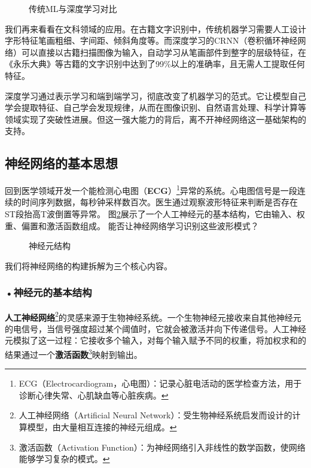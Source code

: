 \begin{figure}[H]
\centering
{}
\caption{传统ML与深度学习对比}
\label{fig:ch2_2_9}
\end{figure}


我们再来看看在文科领域的应用。在古籍文字识别中，传统机器学习需要人工设计字形特征笔画粗细、字间距、倾斜角度等。而深度学习的CRNN（卷积循环神经网络）可以直接以古籍扫描图像为输入，自动学习从笔画部件到整字的层级特征，在《永乐大典》等古籍的文字识别中达到了99\%以上的准确率，且无需人工提取任何特征。

深度学习通过表示学习和端到端学习，彻底改变了机器学习的范式。它让模型自己学会提取特征、自己学会发现规律，从而在图像识别、自然语言处理、科学计算等领域实现了突破性进展。但这一强大能力的背后，离不开神经网络这一基础架构的支持。





\subsection{神经网络的基本思想}
回到医学领域开发一个能检测心电图（\textbf{ECG}）\footnote{ECG（Electrocardiogram，心电图）：记录心脏电活动的医学检查方法，用于诊断心律失常、心肌缺血等心脏疾病。}异常的系统。心电图信号是一段连续的时间序列数据，每秒钟采样数百次。医生通过观察波形特征来判断是否存在ST段抬高T波倒置等异常。
图\ref{fig:ch2_2_10}展示了一个人工神经元的基本结构，它由输入、权重、偏置和激活函数组成。
能否让神经网络学习识别这些波形模式？
\begin{figure}[H]
\centering
{}
\caption{神经元结构}
\label{fig:ch2_2_10}
\end{figure}


我们将神经网络的构建拆解为三个核心内容。

\subsubsection*{\textbf{•神经元的基本结构}}

\textbf{人工神经网络}\footnote{人工神经网络（Artificial Neural Network）：受生物神经系统启发而设计的计算模型，由大量相互连接的神经元组成。}的灵感来源于生物神经系统。一个生物神经元接收来自其他神经元的电信号，当信号强度超过某个阈值时，它就会被激活并向下传递信号。人工神经元模拟了这一过程：它接收多个输入，对每个输入赋予不同的权重，将加权求和的结果通过一个\textbf{激活函数}\footnote{激活函数（Activation Function）：为神经网络引入非线性的数学函数，使网络能够学习复杂的模式。}映射到输出。

